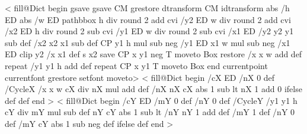 <%
  fill@Dict begin
  gsave
    gsave \tx@STV CM grestore dtransform CM idtransform
    abs /h ED abs /w ED
    pathbbox
    h div round 2 add cvi /y2 ED
    w div round 2 add cvi /x2 ED
    h div round 2 sub cvi /y1 ED
    w div round 2 sub cvi /x1 ED
    /y2 y2 y1 sub def
    /x2 x2 x1 sub def
    CP
    y1 h mul sub neg /y1 ED
    x1 w mul sub neg /x1 ED
    clip
    y2 {
      /x x1 def
      s
      x2 {
        save CP x y1
        \ifx\VTeXversion\undefined
        \else
        neg
        \fi
        T moveto Box restore
        /x x w add def
      } repeat
      /y1 y1 h add def
    } repeat
    CP x y1 T moveto Box
    end
  currentpoint currentfont grestore setfont moveto>
\else
  <
  fill@Dict begin
    /cX ED
    /nX 0 def
    /CycleX {
      /x x w cX div nX mul add def
      /nX nX cX abs 1 sub lt { nX 1 add } { 0 } ifelse def
    } def 
    end
>
<%
  fill@Dict begin
  /cY ED
  /mY 0 def
  /nY 0 def
  /CycleY {
    /y1 y1 h cY div mY mul sub def
    nY cY abs 1 sub lt { /nY nY 1 add def /mY 1 def }
                       { /nY 0 def        /mY cY abs 1 sub neg def } ifelse
  } def
  end
  >


